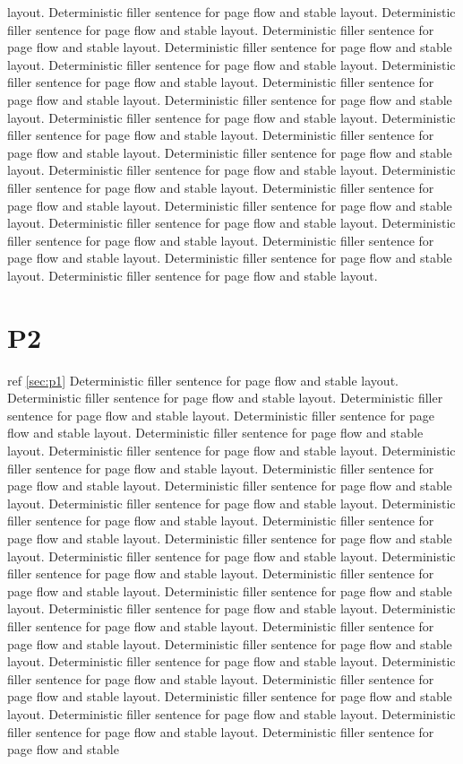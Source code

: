 \documentclass{article}
\begin{document}
layout. Deterministic filler sentence for page flow and stable layout. Deterministic filler sentence for page flow and stable layout. Deterministic filler sentence for page flow and stable layout. Deterministic filler sentence for page flow and stable layout. Deterministic filler sentence for page flow and stable layout. Deterministic filler sentence for page flow and stable layout. Deterministic filler sentence for page flow and stable layout. Deterministic filler sentence for page flow and stable layout. Deterministic filler sentence for page flow and stable layout. Deterministic filler sentence for page flow and stable layout. Deterministic filler sentence for page flow and stable layout. Deterministic filler sentence for page flow and stable layout. Deterministic filler sentence for page flow and stable layout. Deterministic filler sentence for page flow and stable layout. Deterministic filler sentence for page flow and stable layout. Deterministic filler sentence for page flow and stable layout. Deterministic filler sentence for page flow and stable layout. Deterministic filler sentence for page flow and stable layout. Deterministic filler sentence for page flow and stable layout. Deterministic filler sentence for page flow and stable layout. Deterministic filler sentence for page flow and stable layout. \newpage\section{P2} ref \ref{sec:p1} Deterministic filler sentence for page flow and stable layout. Deterministic filler sentence for page flow and stable layout. Deterministic filler sentence for page flow and stable layout. Deterministic filler sentence for page flow and stable layout. Deterministic filler sentence for page flow and stable layout. Deterministic filler sentence for page flow and stable layout. Deterministic filler sentence for page flow and stable layout. Deterministic filler sentence for page flow and stable layout. Deterministic filler sentence for page flow and stable layout. Deterministic filler sentence for page flow and stable layout. Deterministic filler sentence for page flow and stable layout. Deterministic filler sentence for page flow and stable layout. Deterministic filler sentence for page flow and stable layout. Deterministic filler sentence for page flow and stable layout. Deterministic filler sentence for page flow and stable layout. Deterministic filler sentence for page flow and stable layout. Deterministic filler sentence for page flow and stable layout. Deterministic filler sentence for page flow and stable layout. Deterministic filler sentence for page flow and stable layout. Deterministic filler sentence for page flow and stable layout. Deterministic filler sentence for page flow and stable layout. Deterministic filler sentence for page flow and stable layout. Deterministic filler sentence for page flow and stable layout. Deterministic filler sentence for page flow and stable layout. Deterministic filler sentence for page flow and stable layout. Deterministic filler sentence for page flow and stable layout. Deterministic filler sentence for page flow and stable layout. Deterministic filler sentence for page flow and stable 
\end{document}
